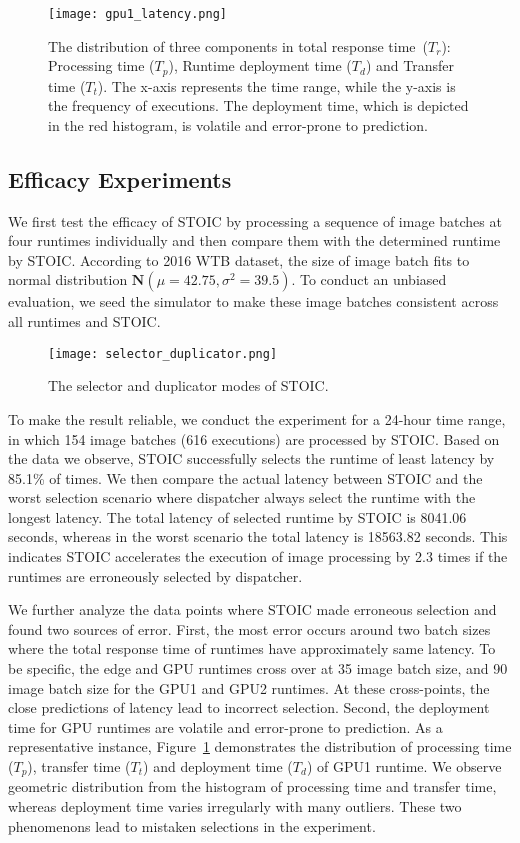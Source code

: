 \begin{figure}[t] \centering 
\texttt{[image: gpu1\_latency.png]}
\caption{The distribution of three components in total response time~($T_r$): Processing time ($T_p$), Runtime deployment time ($T_d$) and Transfer time ($T_t$). The x-axis represents the time range, while the y-axis is the frequency of executions. The deployment time, which is depicted in the red histogram, is volatile and error-prone to prediction.
\label{fig:breakdown}}
\end{figure}

\subsection{Efficacy Experiments}

We first test the efficacy of STOIC by processing a sequence of image batches at four runtimes individually and then compare them with the determined runtime by STOIC. According to 2016 WTB dataset, the size of image batch fits to normal distribution $\mathbf{N}(\mu = 42.75, \sigma^2 = 39.5)$. To conduct an unbiased evaluation, we seed the simulator to make these image batches consistent across all runtimes and STOIC.

\begin{figure}[t] \centering 
\texttt{[image: selector\_duplicator.png]}
\caption{The selector and duplicator modes of STOIC. 
\label{fig:duplicator}}
\end{figure}

To make the result reliable, we conduct the experiment for a 24-hour time range, in which  154 image batches (616 executions) are processed by STOIC. Based on the data we observe, STOIC successfully selects the runtime of least latency by 85.1\% of times. We then compare the actual latency between STOIC and the worst selection scenario where dispatcher always select the runtime with the longest latency. The total latency of selected runtime by STOIC is 8041.06 seconds, whereas in the worst scenario the total latency is 18563.82 seconds. This indicates STOIC accelerates the execution of image processing by 2.3 times if the runtimes are erroneously selected by dispatcher.

We further analyze the data points where STOIC made erroneous selection and found two sources of error. First, the most error occurs around two batch sizes where the total response time of runtimes have approximately same latency. To be specific, the edge and GPU runtimes cross over at 35 image batch size, and 90 image batch size for the GPU1 and GPU2 runtimes. At these cross-points, the close predictions of latency lead to incorrect selection. Second, the deployment time for GPU runtimes are volatile and error-prone to prediction. As a representative instance, Figure~\ref{fig:breakdown} demonstrates the distribution of processing time ($T_p$), transfer time ($T_t$) and deployment time ($T_d$) of GPU1 runtime. We observe geometric distribution from the histogram of processing time and transfer time, whereas deployment time varies irregularly with many outliers. These two phenomenons lead to mistaken selections in the experiment.

